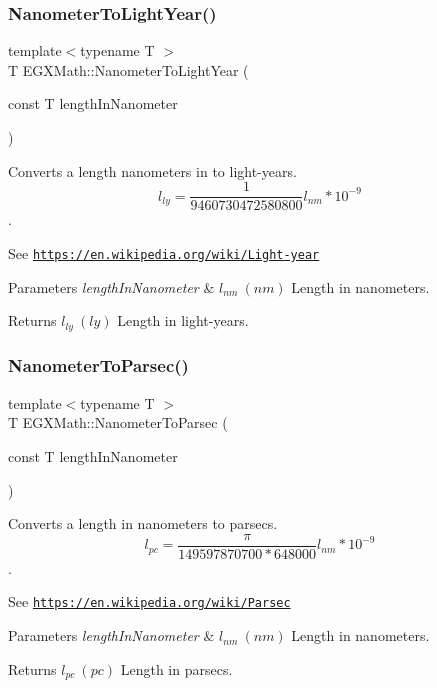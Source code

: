 \subsubsection{\texorpdfstring{Nanometer\+To\+Light\+Year()}{NanometerToLightYear()}}
{\footnotesize\ttfamily template$<$typename T $>$ \\
T E\+G\+X\+Math\+::\+Nanometer\+To\+Light\+Year (\begin{DoxyParamCaption}\item[{const T}]{length\+In\+Nanometer }\end{DoxyParamCaption})}



Converts a length nanometers in to light-\/years. \[ l_{ly}= \frac{1}{9460730472580800} l_{nm} * 10^{-9} \]. 

See \href{https://en.wikipedia.org/wiki/Light-year}{\tt https\+://en.\+wikipedia.\+org/wiki/\+Light-\/year} 
\begin{DoxyParams}{Parameters}
{\em length\+In\+Nanometer} & $ l_{nm}\ (nm)$ Length in nanometers. \\
\hline
\end{DoxyParams}
\begin{DoxyReturn}{Returns}
$ l_{ly}\ (ly)$ Length in light-\/years. 
\end{DoxyReturn}
\mbox{\label{group___e_g_x_math-_conversions-_length_conversions-_nanometer-_astronomical_ga20e55ba8ac39aaf9b27c4092266cdcee}} 
\subsubsection{\texorpdfstring{Nanometer\+To\+Parsec()}{NanometerToParsec()}}
{\footnotesize\ttfamily template$<$typename T $>$ \\
T E\+G\+X\+Math\+::\+Nanometer\+To\+Parsec (\begin{DoxyParamCaption}\item[{const T}]{length\+In\+Nanometer }\end{DoxyParamCaption})}



Converts a length in nanometers to parsecs. \[ l_{pc}=\frac{\pi}{149597870700 * 648000} l_{nm} * 10^{-9} \]. 

See \href{https://en.wikipedia.org/wiki/Parsec}{\tt https\+://en.\+wikipedia.\+org/wiki/\+Parsec} 
\begin{DoxyParams}{Parameters}
{\em length\+In\+Nanometer} & $ l_{nm}\ (nm)$ Length in nanometers. \\
\hline
\end{DoxyParams}
\begin{DoxyReturn}{Returns}
$ l_{pc}\ (pc)$ Length in parsecs. 
\end{DoxyReturn}
